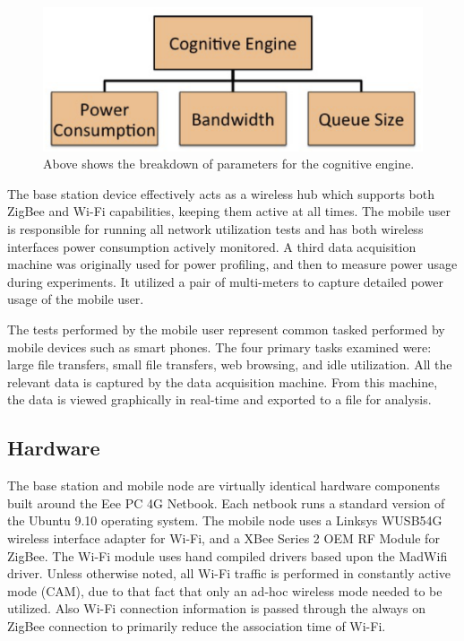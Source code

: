 \documentclass[conference]{IEEEtran}
\begin{document}
\begin{figure}
\begin{center}
\includegraphics[scale=0.40]{cognitive_para.eps}
\caption{Above shows the breakdown of parameters for the cognitive engine.}
\end{center}
\end{figure}

The base station device effectively acts as a wireless hub which supports both ZigBee and Wi-Fi capabilities, keeping them active at all times.  The mobile user is responsible for running all network utilization tests and has both wireless interfaces power consumption actively monitored. A third data acquisition machine was originally used for power profiling, and then to measure power usage during experiments.  It utilized a pair of multi-meters to capture detailed power usage of the mobile user. 

The tests performed by the mobile user represent common tasked performed by mobile devices such as smart phones.  The four primary tasks examined were: large file transfers, small file transfers, web browsing, and idle utilization.  All the relevant data is captured by the data acquisition machine. From this machine, the data is viewed graphically in real-time and exported to a file for analysis. 

\subsection{Hardware}
The base station and mobile node are virtually identical hardware components built around the Eee PC 4G Netbook. Each netbook runs a standard version of the Ubuntu 9.10 operating system.  The mobile node uses a Linksys WUSB54G wireless interface adapter for Wi-Fi, and a XBee Series 2 OEM RF Module for ZigBee. The Wi-Fi module uses hand compiled drivers based upon the MadWifi driver. Unless otherwise noted, all Wi-Fi traffic is performed in constantly active mode (CAM), due to that fact that only an ad-hoc wireless mode needed to be utilized.  Also Wi-Fi connection information is passed through the always on ZigBee connection to primarily reduce the association time of Wi-Fi.
\end{document}
